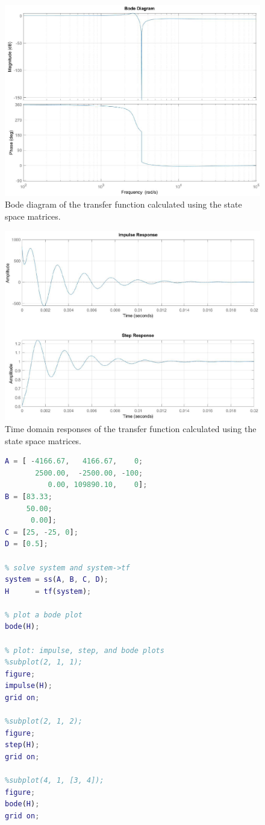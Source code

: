 \documentclass{homework}
\begin{document}
	\begin{figure}[H]
		\centering
		\includegraphics[width=0.7\linewidth]{ssbode}
		\caption{Bode diagram of the transfer function calculated using the state space matrices.}
		\label{fig:ssbode}
	\end{figure}
	
	\begin{figure}[H]
		\centering
		\includegraphics[width=0.7\linewidth]{ssresp}
		\caption{Time domain responses of the transfer function calculated using the state space matrices.}
		\label{fig:ssresp}
	\end{figure}

	\begin{figure}[H]
	\begin{lstlisting}[language=matlab, caption={MATLAB code for solving for the transfer function using state space equations.},label={lst:mtx}]
A = [ -4166.67,   4166.67,    0;
       2500.00,  -2500.00, -100;
          0.00, 109890.10,    0];  
B = [83.33;
     50.00;
      0.00];
C = [25, -25, 0];
D = [0.5];

% solve system and system->tf
system = ss(A, B, C, D);
H      = tf(system);

% plot a bode plot
bode(H);

% plot: impulse, step, and bode plots
%subplot(2, 1, 1);
figure;
impulse(H);
grid on;

%subplot(2, 1, 2);
figure;
step(H);
grid on;

%subplot(4, 1, [3, 4]);
figure;
bode(H);
grid on;
	\end{lstlisting}
\end{figure}	
	\pagebreak
\end{document}
